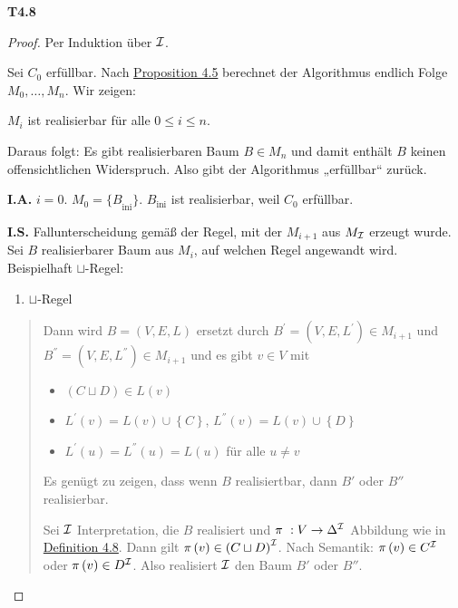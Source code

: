 \textbf{T4.8}

\begin{proof}

Per Induktion über $\mathcal{I}$. 

Sei $C_{0}$ erfüllbar. Nach \protect\hyperlink{proposition-4.5-terminierung}{Proposition 4.5} berechnet der Algorithmus endlich Folge $M_{0},\ldots,M_{n}$. Wir
zeigen: 

$M_{i}$ ist realisierbar für alle $0 \leq i \leq n$. 

Daraus folgt: Es gibt realisierbaren Baum $B \in M_{n}$ und damit enthält $B$ keinen offensichtlichen Widerspruch. Also gibt der Algorithmus „erfüllbar`` zurück.

\textbf{I.A.} $i = 0$. $M_{0} = {\{ B}_{\text{ini}}\}$.
$B_{\text{ini}}$ ist realisierbar, weil $C_{0}$ erfüllbar.

\textbf{I.S.} Fallunterscheidung gemäß der Regel, mit der $M_{i + 1}$
aus $M_{\mathcal{I}}$ erzeugt wurde. Sei $B$ realisierbarer Baum aus
$M_i$, auf welchen Regel angewandt wird. Beispielhaft
$\sqcup$-Regel:

\begin{enumerate}
\def\labelenumi{\arabic{enumi}.}
\item
  $\sqcup$-Regel
\end{enumerate}

\begin{quote}
Dann wird $B = \left( V,E,L \right)$ ersetzt durch
$B^{'} = \left( V,E,L^{'} \right) \in M_{i + 1}$ und
$B^{''} = \left( V,E,L^{''} \right) \in M_{i + 1}$ und es gibt
$v \in V$ mit

\begin{itemize}
\item
  $\left( C \sqcup D \right) \in L(v)$
\item
  $L^{'}\left( v \right) = L\left( v \right) \cup \left\{ C \right\}$,
  $L^{''}\left( v \right) = L\left( v \right) \cup \left\{ D \right\}$
\item
  $L^{'}\left( u \right) = L^{''}\left( u \right) = L\left( u \right)$
  für alle $u \neq v$
\end{itemize}

Es genügt zu zeigen, dass wenn $B$ realisiertbar, dann $B'$ oder
$B''$ realisierbar. 

Sei $\mathcal{I}$ Interpretation, die $B$ realisiert und $\pi\ :V \rightarrow \Delta^{\mathcal{I}}$ Abbildung wie in \protect\hyperlink{realisierbarkeit}{Definition 4.8}. Dann gilt $\pi\left( v \right) \in \left( C \sqcup D \right)^{\mathcal{I}}$. Nach Semantik: $\pi\left( v \right) \in C^{\mathcal{I}}$ oder $\pi\left( v \right) \in D^{\mathcal{I}}$. Also realisiert $\mathcal{I}$ den Baum $B'$ oder $B''$.
\end{quote}
\end{proof}

